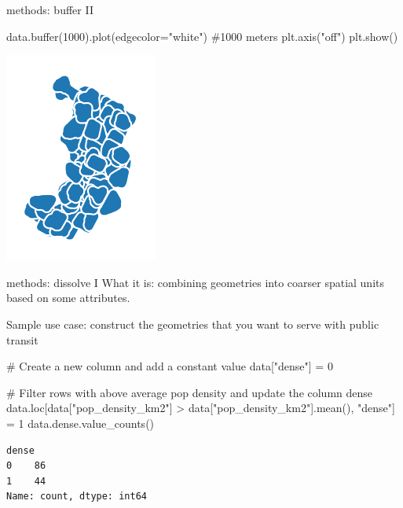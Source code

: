 \documentclass[
  ignorenonframetext,
]{beamer}
\newenvironment{Shaded}{\begin{snugshade}}{\end{snugshade}}
\newcommand{\BuiltInTok}[1]{\textcolor[rgb]{0.00,0.23,0.31}{#1}}
\newcommand{\CommentTok}[1]{\textcolor[rgb]{0.37,0.37,0.37}{#1}}
\newcommand{\DecValTok}[1]{\textcolor[rgb]{0.68,0.00,0.00}{#1}}
\newcommand{\NormalTok}[1]{\textcolor[rgb]{0.00,0.23,0.31}{#1}}
\newcommand{\OperatorTok}[1]{\textcolor[rgb]{0.37,0.37,0.37}{#1}}
\newcommand{\StringTok}[1]{\textcolor[rgb]{0.13,0.47,0.30}{#1}}
\begin{document}
\begin{frame}[fragile]{methods: buffer II}
\label{methods-buffer-ii}
\begin{Shaded}
\begin{Highlighting}[]
\NormalTok{data.}\BuiltInTok{buffer}\NormalTok{(}\DecValTok{1000}\NormalTok{).plot(edgecolor}\OperatorTok{=}\StringTok{"white"}\NormalTok{) }\CommentTok{\#1000 meters}
\NormalTok{plt.axis(}\StringTok{"off"}\NormalTok{)}
\NormalTok{plt.show()}
\end{Highlighting}
\end{Shaded}

\includegraphics{spatial_2_files/figure-beamer/cell-24-output-1.pdf}
\end{frame}

\begin{frame}[fragile]{methods: dissolve I}
\label{methods-dissolve-i}
What it is: combining geometries into coarser spatial units based on
some attributes.

Sample use case: construct the geometries that you want to serve with
public transit

\begin{Shaded}
\begin{Highlighting}[]
\CommentTok{\# Create a new column and add a constant value}
\NormalTok{data[}\StringTok{"dense"}\NormalTok{] }\OperatorTok{=} \DecValTok{0}

\CommentTok{\# Filter rows with above average pop density and update the column dense}
\NormalTok{data.loc[data[}\StringTok{"pop\_density\_km2"}\NormalTok{] }\OperatorTok{\textgreater{}}\NormalTok{ data[}\StringTok{"pop\_density\_km2"}\NormalTok{].mean(), }\StringTok{"dense"}\NormalTok{] }\OperatorTok{=} \DecValTok{1}
\NormalTok{data.dense.value\_counts()}
\end{Highlighting}
\end{Shaded}

\begin{verbatim}
dense
0    86
1    44
Name: count, dtype: int64
\end{verbatim}
\end{frame}
\end{document}
